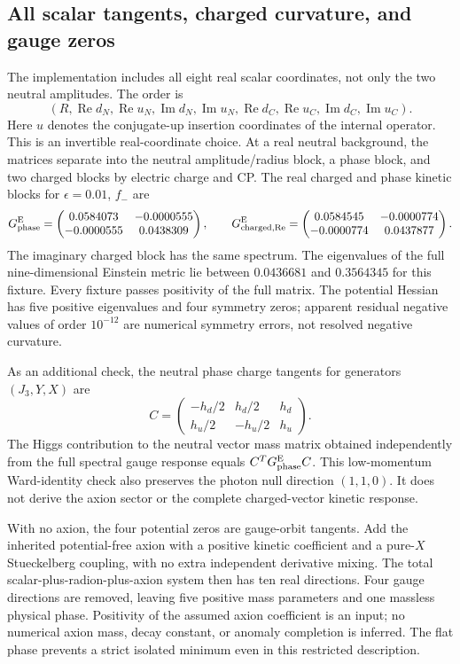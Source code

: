 \subsection{All scalar tangents, charged curvature, and gauge zeros}

The implementation includes all eight real scalar coordinates, not only the two neutral amplitudes. The order is
\begin{equation}
 (R,\operatorname{Re}d_N,\operatorname{Re}u_N,
 \operatorname{Im}d_N,\operatorname{Im}u_N,
 \operatorname{Re}d_C,\operatorname{Re}u_C,
 \operatorname{Im}d_C,\operatorname{Im}u_C).
\end{equation}
Here $u$ denotes the conjugate-up insertion coordinates of the internal operator. This is an invertible real-coordinate choice. At a real neutral background, the matrices separate into the neutral amplitude/radius block, a phase block, and two charged blocks by electric charge and CP. The real charged and phase kinetic blocks for $\epsilon=0.01$, $f_-$ are
\begin{equation}
 G^{\mathrm E}_{\rm phase}=\begin{pmatrix}0.0584073 & -0.0000555\\-0.0000555 & 0.0438309\end{pmatrix},\qquad
 G^{\mathrm E}_{\rm charged,Re}=\begin{pmatrix}0.0584545 & -0.0000774\\-0.0000774 & 0.0437877\end{pmatrix}.
\end{equation}
The imaginary charged block has the same spectrum. The eigenvalues of the full nine-dimensional Einstein metric lie between $0.0436681$ and $0.3564345$ for this fixture. Every fixture passes positivity of the full matrix. The potential Hessian has five positive eigenvalues and four symmetry zeros; apparent residual negative values of order $10^{-12}$ are numerical symmetry errors, not resolved negative curvature.

As an additional check, the neutral phase charge tangents for generators $(J_3,Y,X)$ are
\begin{equation}
 C=\begin{pmatrix}-h_d/2&h_d/2&h_d\\h_u/2&-h_u/2&h_u\end{pmatrix}.
\end{equation}
The Higgs contribution to the neutral vector mass matrix obtained independently from the full spectral gauge response equals $C^TG^{\mathrm E}_{\rm phase}C$. This low-momentum Ward-identity check also preserves the photon null direction $(1,1,0)$. It does not derive the axion sector or the complete charged-vector kinetic response.

With no axion, the four potential zeros are gauge-orbit tangents. Add the inherited potential-free axion with a positive kinetic coefficient and a pure-$X$ Stueckelberg coupling, with no extra independent derivative mixing. The total scalar-plus-radion-plus-axion system then has ten real directions. Four gauge directions are removed, leaving five positive mass parameters and one massless physical phase. Positivity of the assumed axion coefficient is an input; no numerical axion mass, decay constant, or anomaly completion is inferred. The flat phase prevents a strict isolated minimum even in this restricted description.

